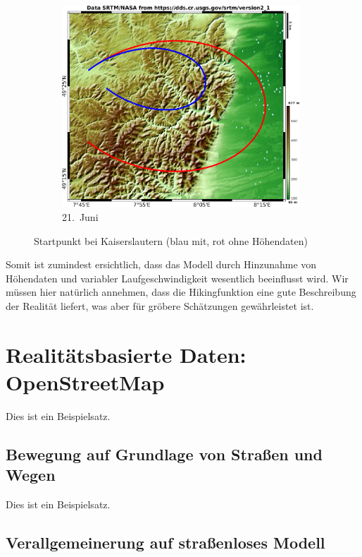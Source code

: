 \documentclass[
    paper=a4,
    DIV14,
    fontsize=12pt,
    pagesize=pdftex,
    toc=bibliographynumbered
]{scrartcl}
\numberwithin{figure}{section}
\numberwithin{equation}{section}
\numberwithin{table}{section}
\begin{document}
\begin{figure}[hbt]
\begin{subfigure}{0.685\textwidth}
        \centering
        \includegraphics[width=0.98\textwidth]{images/elediff/jun21.png}
        \caption{21.\ Juni}
    \end{subfigure}
    \caption{Startpunkt bei Kaiserslautern (blau mit, rot ohne Höhendaten)}
    \label{fig:elediff1}
\end{figure}

Somit ist zumindest ersichtlich, dass das Modell durch Hinzunahme von Höhendaten und
variabler Laufgeschwindigkeit wesentlich beeinflusst wird. Wir müssen hier natürlich
annehmen, dass die Hikingfunktion eine gute Beschreibung der Realität liefert, was aber
für gröbere Schätzungen gewährleistet ist.

\section{Realitätsbasierte Daten: OpenStreetMap}

Dies ist ein Beispielsatz.

\subsection{Bewegung auf Grundlage von Straßen und Wegen}

Dies ist ein Beispielsatz.

\subsection{Verallgemeinerung auf straßenloses Modell}
\end{document}
